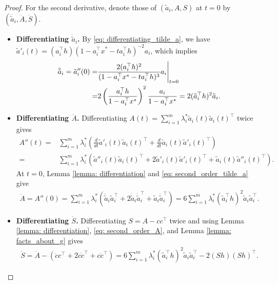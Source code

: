 \documentclass[10pt,a4paper]{amsart}
\begin{document}
\begin{proof}
    For the second derivative, denote those of $(\tilde{a}_i,A,S)$ at $t=0$ by
    $(\ddot{\tilde{a}}_i,\ddot A,\ddot S)$.
    \begin{itemize}
        \item \textbf{Differentiating $\dot{\tilde{a}}_i$.} By \eqref{eq: differentiating_tilde_a}, we have $\tilde{a}'_i(t) = (a_i^\top h)(1 - a_i^\top x^*-t a_i^\top h)^{-2} a_i$, which implies
        \begin{align}\label{eq: second_order_tilde_a}
        \ddot{\tilde{a}}_i= \tilde{a}''_i(0) =  & \frac{2(a_i^\top h)^2}{(1-a_i^\top x^* - ta_i^\top h)^3} a_i \Bigg|_{t=0} \notag \\
        = & 2\left(\frac{a_i^\top h}{1-a_i^\top x^*}\right)^2 \frac{a_i}{1-a_i^\top x^*} = 2(\tilde{a}_i^\top h)^2 \tilde{a}_i.
        \end{align}
        \item \textbf{Differentiating $\dot{A}$.} Differentiating
        $A(t)=\sum_{i=1}^m\lambda_i^*\tilde a_i(t)\tilde a_i(t)^\top$ twice gives
        \begin{align*}
            A''(t) = & \sum_{i=1}^m \lambda_i^*\left(\frac{d}{dt} \tilde{a}'_i(t)\tilde{a}_i(t)^\top + \frac{d}{dt}\tilde{a}_i(t) \tilde{a}'_i(t)^\top \right) \\
            = &  \sum_{i=1}^m \lambda_i^*\left(\tilde{a}''_i(t) \tilde{a}_i(t)^\top + 2\tilde{a}'_i(t)\tilde{a}'_i(t)^\top + \tilde{a}_i(t)\tilde{a}''_i(t)^\top  \right).
        \end{align*}
        At $t=0$, Lemma \ref{lemma: differentiation} and
        \eqref{eq: second_order_tilde_a} give
        \begin{align}\label{eq: second_order_A}
            \ddot{A} = A''(0) =\sum_{i=1}^m \lambda_i^* \left(\ddot{\tilde{a}}_i \tilde{a}_i^\top + 2 \dot{\tilde{a}}_i\dot{\tilde{a}}_i^\top + \tilde{a}_i \ddot{\tilde{a}}_i^\top \right) =  6 \sum_{i=1}^m \lambda_i^* (\tilde{a}_i^\top h)^2 \tilde{a}_i \tilde{a}_i^\top.
        \end{align}
        \item \textbf{Differentiating $\dot{S}$.} Differentiating
        $S=A-cc^\top$ twice and using Lemma \ref{lemma: differentiation},
        \eqref{eq: second_order_A}, and Lemma \ref{lemma: facts_about_g} gives
        \begin{align}
            \ddot{S} = \ddot{A} - (\ddot{c}c^\top + 2\dot{c}\dot{c}^\top + c\ddot{c}^\top) =  6 \sum_{i=1}^m \lambda_i^* (\tilde{a}_i^\top h)^2 \tilde{a}_i \tilde{a}_i^\top - 2(Sh)(Sh)^\top.\label{eq: second_order_S}

\end{align}
\end{itemize}
\end{proof}
\end{document}
